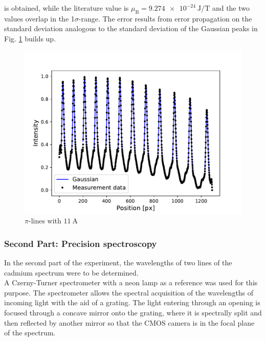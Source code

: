 is obtained, while the literature value is $\mu_\text{B}=\SI{9.274e-24}{\joule\per\tesla}$ and the two values overlap in the 1$\sigma$-range.
The error results from error propagation on the standard deviation analogous to the standard deviation of the Gaussian peaks in Fig. \ref{fig:gaussian} builds up.
\begin{figure}[ht]
\centering
\includegraphics[scale=.55]{images//gaussian.pdf}
\caption{$\pi$-lines with $\SI{11}{\ampere}$}
\label{fig:gaussian}
\end{figure}


\subsubsection{Second Part: Precision spectroscopy}
In the second part of the experiment, the wavelengths of two lines of the cadmium spectrum were to be determined.\\

A Czerny-Turner spectrometer with a neon lamp as a reference was used for this purpose.
The spectrometer allows the spectral acquisition of the wavelengths of incoming light with the aid of a grating.
The light entering through an opening is focused through a concave mirror onto the grating, where it is spectrally split and then reflected by another mirror so that the CMOS camera is in the focal plane of the spectrum.\\

